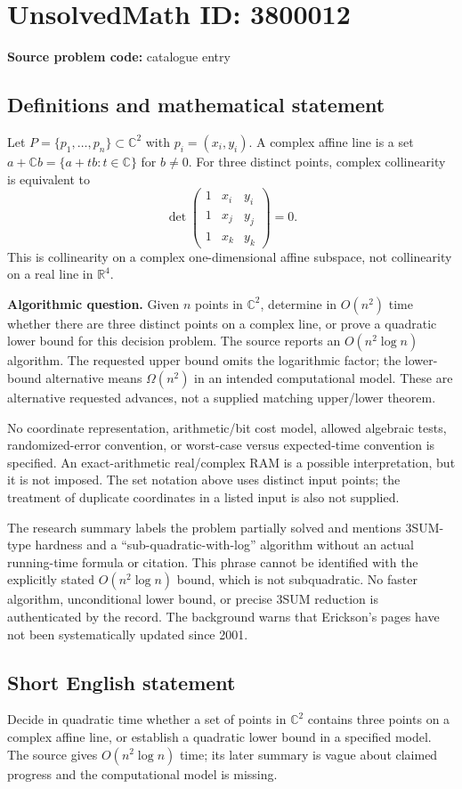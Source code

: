 \documentclass[11pt]{article}
\newcommand{\R}{\mathbb{R}}
\newcommand{\C}{\mathbb{C}}
\begin{document}
\section*{UnsolvedMath ID: 3800012}
\textbf{Source problem code:} catalogue entry
\subsection{Definitions and mathematical statement}
Let $P=\{p_1,\ldots,p_n\}\subset\C^2$ with $p_i=(x_i,y_i)$. A complex affine line is a set $a+\C b=\{a+tb:t\in\C\}$ for $b\ne0$. For three distinct points, complex collinearity is equivalent to
\[
 \det\begin{pmatrix}
 1&x_i&y_i\\1&x_j&y_j\\1&x_k&y_k
 \end{pmatrix}=0.
\]
This is collinearity on a complex one-dimensional affine subspace, not collinearity on a real line in $\R^4$.

\textbf{Algorithmic question.} Given $n$ points in $\C^2$, determine in $O(n^2)$ time whether there are three distinct points on a complex line, or prove a quadratic lower bound for this decision problem. The source reports an $O(n^2\log n)$ algorithm. The requested upper bound omits the logarithmic factor; the lower-bound alternative means $\Omega(n^2)$ in an intended computational model. These are alternative requested advances, not a supplied matching upper/lower theorem.

No coordinate representation, arithmetic/bit cost model, allowed algebraic tests, randomized-error convention, or worst-case versus expected-time convention is specified. An exact-arithmetic real/complex RAM is a possible interpretation, but it is not imposed. The set notation above uses distinct input points; the treatment of duplicate coordinates in a listed input is also not supplied.

The research summary labels the problem partially solved and mentions 3SUM-type hardness and a ``sub-quadratic-with-log'' algorithm without an actual running-time formula or citation. This phrase cannot be identified with the explicitly stated $O(n^2\log n)$ bound, which is not subquadratic. No faster algorithm, unconditional lower bound, or precise 3SUM reduction is authenticated by the record. The background warns that Erickson's pages have not been systematically updated since 2001.
\subsection{Short English statement}
Decide in quadratic time whether a set of points in $\C^2$ contains three points on a complex affine line, or establish a quadratic lower bound in a specified model. The source gives $O(n^2\log n)$ time; its later summary is vague about claimed progress and the computational model is missing.
\end{document}
